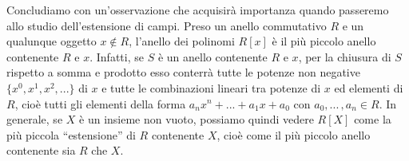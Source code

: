 \noindent Concludiamo con un'osservazione che acquisirà importanza quando passeremo allo studio dell'estensione di campi. 
Preso un anello commutativo $R$ e un qualunque oggetto $x\not\in R$, l'anello dei polinomi $R[x]$ è il più piccolo anello contenente $R$ e $x$. 
Infatti, se $S$ è un anello contenente $R$ e $x$, per la chiusura di $S$ rispetto a somma e prodotto esso conterrà tutte le potenze non negative 
$\{x^0, x^1, x^2, ...\}$ di $x$ e tutte le combinazioni lineari tra potenze di $x$ ed elementi di $R$, cioè tutti gli elementi della forma 
$a_nx^n + ... + a_1x+a_0$ con $a_0,...\,,a_n\in R$. In generale, se $X$ è un insieme non vuoto, 
possiamo quindi vedere $R[X]$ come la più piccola ``estensione'' di $R$ contenente $X$, cioè come il più piccolo anello contenente sia $R$ che $X$.
